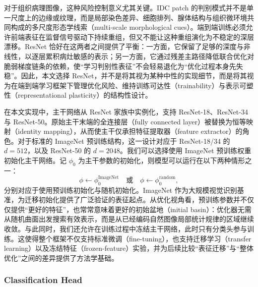 对于组织病理图像，这种风险控制意义尤其关键。IDC patch 的判别模式并不是单一尺度上的边缘或纹理，而是局部染色差异、细胞排列、腺体结构与组织微环境共同构成的多尺度形态学线索（multi-scale morphological cues）。端到端训练必须允许前端表征在监督信号驱动下持续重组，但又不能让这种重组演化为不稳定的深层漂移。ResNet 恰好在这两者之间提供了平衡：一方面，它保留了足够的深度与非线性，以逐层累积病灶敏感的表示；另一方面，它通过残差主路径降低联合优化对脆弱梯度链条的依赖，使“学习判别性表征”不会轻易退化为“优化过程本身先失稳”。因此，本文选择 ResNet，并不是将其视为某种中性的实现细节，而是将其视为在端到端学习框架下管理优化风险、维持训练可达性（trainability）与表示可塑性（representational plasticity）的结构性设计\cite{He2016ResNet}。

在本文实现中，主干网络从 ResNet 家族中实例化，支持 ResNet-18、ResNet-34 与 ResNet-50。原始主干末端的全连接层（fully connected layer）被替换为恒等映射（identity mapping），从而使主干仅承担特征提取器（feature extractor）的角色。对于标准的 ImageNet 预训练结构，这一设计对应于 ResNet-18/34 的 $d=512$，以及 ResNet-50 的 $d=2048$。我们可以选择使用 ImageNet 预训练权重初始化主干网络。记 $\phi_{0}$ 为主干参数的初始化，则模型可以运行在以下两种情形之一：
\begin{equation}
    \phi \leftarrow \phi_{0}^{\text{ImageNet}} \quad \text{或} \quad \phi \leftarrow \phi_{0}^{\text{random}},
\end{equation}
分别对应于使用预训练初始化与随机初始化。ImageNet 作为大规模视觉识别基准，为迁移初始化提供了广泛验证的表征起点\cite{Russakovsky2015ImageNet}。从优化视角看，预训练参数并不仅仅提供“更好的特征”，也常常意味着更好的初始盆地（initial basin）：优化器无需从随机曲面出发搜索有效表示，而是从已经编码自然图像局部统计规律的区域继续收敛。与此同时，我们还允许在训练过程中冻结主干网络，此时只有分类头参与训练。这使得整个框架不仅支持标准微调（fine-tuning），也支持迁移学习（transfer learning）以及冻结特征（frozen-feature）实验，并为后续比较“表征迁移”与“整体优化”之间的差异提供了方法学基础\cite{Pan2010TransferLearning}。

\subsubsection{Classification Head}

